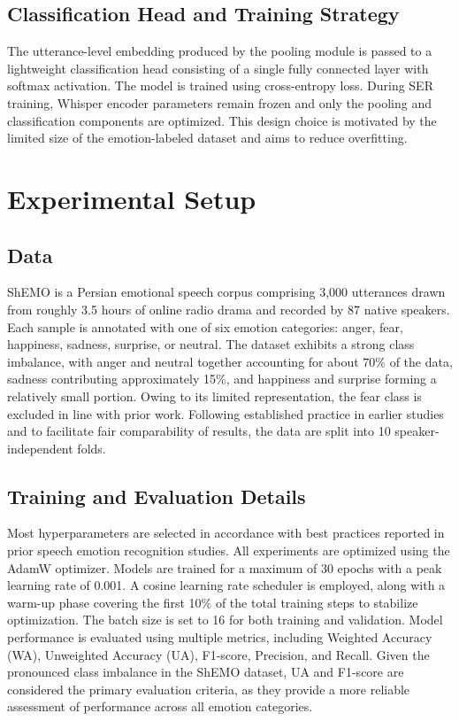 \documentclass[conference]{IEEEtran}
\begin{document}
\subsection{Classification Head and Training Strategy}
The utterance-level embedding produced by the pooling module is passed to a lightweight classification head consisting of a single fully connected layer with softmax activation. The model is trained using cross-entropy loss. During SER training, Whisper encoder parameters remain frozen  and only the pooling and classification components are optimized. This design choice is motivated by the limited size of the emotion-labeled dataset and aims to reduce overfitting.
\section{Experimental Setup}
\subsection{Data}
ShEMO is a Persian emotional speech corpus comprising 3,000 utterances drawn from roughly 3.5 hours of online radio drama and recorded by 87 native speakers. Each sample is annotated with one of six emotion categories: anger, fear, happiness, sadness, surprise, or neutral. The dataset exhibits a strong class imbalance, with anger and neutral together accounting for about 70\% of the data, sadness contributing approximately 15\%, and happiness and surprise forming a relatively small portion. Owing to its limited representation, the fear class is excluded in line with prior work. Following established practice in earlier studies and to facilitate fair comparability of results, the data are split into 10 speaker-independent folds.
\subsection{Training and Evaluation Details}
Most hyperparameters are selected in accordance with best practices reported in prior speech emotion recognition studies. All experiments are optimized using the AdamW optimizer. Models are trained for a maximum of 30 epochs with a peak learning rate of 0.001. A cosine learning rate scheduler is employed, along with a warm-up phase covering the first 10\% of the total training steps to stabilize optimization. The batch size is set to 16 for both training and validation.
Model performance is evaluated using multiple metrics, including Weighted Accuracy (WA), Unweighted Accuracy (UA), F1-score, Precision, and Recall. Given the pronounced class imbalance in the ShEMO dataset, UA and F1-score are considered the primary evaluation criteria, as they provide a more reliable assessment of performance across all emotion categories.
\end{document}
